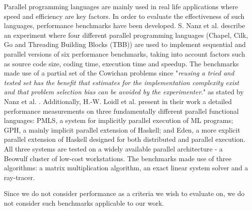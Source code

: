 Parallel programming languages are mainly used in real life applications where speed and efficiency are key factors. In order to evaluate the effectiveness of such languages, performance benchmarks have been developed. S. Nanz et al. \cite{MulticoreLangs} describe an experiment where four different parallel programming languages (Chapel, Cilk, Go and Threading Building Blocks (TBB)) are used to implement sequential and parallel versions of six performance benchmarks, taking into account factors such as source code size, coding time, execution time and speedup. The benchmarks made use of a partial set of the Cowichan problems \cite{CowichanProblems} since "\textit{reusing a tried and tested set has the benefit that
estimates for the implementation complexity exist and that
problem selection bias can be avoided by the experimenter}." as stated by Nanz et al. \cite{MulticoreLangs}. Additionally, H.-W. Loidl et al. \cite{ParallelFunctLangs} present in their work a detailed performance measurements on three fundamentally different parallel functional languages: PMLS, a system for implicitly parallel execution of ML programs; GPH, a mainly implicit parallel extension of Haskell; and Eden, a more explicit parallel extension of Haskell designed for both distributed and parallel execution. All three systems are tested on a widely available parallel architecture - a Beowulf cluster of low-cost workstations. The benchmarks made use of three algorithms: a matrix multiplication algorithm, an exact linear system solver and a ray-tracer. 

Since we do not consider performance as a criteria we wish to evaluate on, we do not consider such benchmarks applicable to our work.

